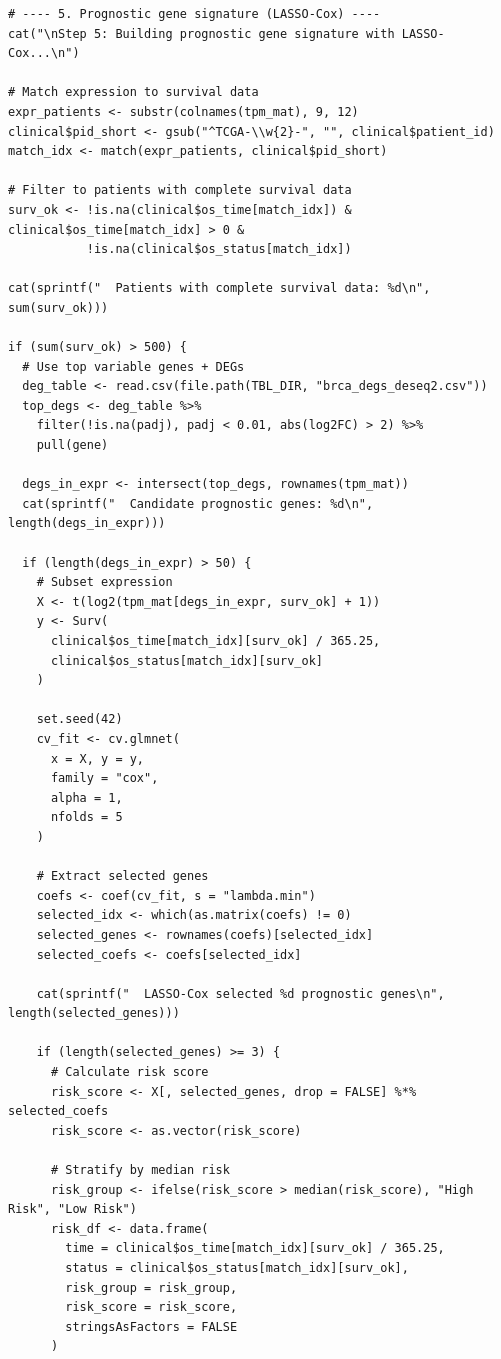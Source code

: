\documentclass[12pt,a4paper]{ctexart}
\begin{document}
\begin{lstlisting}[caption={11_survival_analysis}, basicstyle=\ttfamily\scriptsize]
# ---- 5. Prognostic gene signature (LASSO-Cox) ----
cat("\nStep 5: Building prognostic gene signature with LASSO-Cox...\n")

# Match expression to survival data
expr_patients <- substr(colnames(tpm_mat), 9, 12)
clinical$pid_short <- gsub("^TCGA-\\w{2}-", "", clinical$patient_id)
match_idx <- match(expr_patients, clinical$pid_short)

# Filter to patients with complete survival data
surv_ok <- !is.na(clinical$os_time[match_idx]) & clinical$os_time[match_idx] > 0 &
           !is.na(clinical$os_status[match_idx])

cat(sprintf("  Patients with complete survival data: %d\n", sum(surv_ok)))

if (sum(surv_ok) > 500) {
  # Use top variable genes + DEGs
  deg_table <- read.csv(file.path(TBL_DIR, "brca_degs_deseq2.csv"))
  top_degs <- deg_table %>%
    filter(!is.na(padj), padj < 0.01, abs(log2FC) > 2) %>%
    pull(gene)

  degs_in_expr <- intersect(top_degs, rownames(tpm_mat))
  cat(sprintf("  Candidate prognostic genes: %d\n", length(degs_in_expr)))

  if (length(degs_in_expr) > 50) {
    # Subset expression
    X <- t(log2(tpm_mat[degs_in_expr, surv_ok] + 1))
    y <- Surv(
      clinical$os_time[match_idx][surv_ok] / 365.25,
      clinical$os_status[match_idx][surv_ok]
    )

    set.seed(42)
    cv_fit <- cv.glmnet(
      x = X, y = y,
      family = "cox",
      alpha = 1,
      nfolds = 5
    )

    # Extract selected genes
    coefs <- coef(cv_fit, s = "lambda.min")
    selected_idx <- which(as.matrix(coefs) != 0)
    selected_genes <- rownames(coefs)[selected_idx]
    selected_coefs <- coefs[selected_idx]

    cat(sprintf("  LASSO-Cox selected %d prognostic genes\n", length(selected_genes)))

    if (length(selected_genes) >= 3) {
      # Calculate risk score
      risk_score <- X[, selected_genes, drop = FALSE] %*% selected_coefs
      risk_score <- as.vector(risk_score)

      # Stratify by median risk
      risk_group <- ifelse(risk_score > median(risk_score), "High Risk", "Low Risk")
      risk_df <- data.frame(
        time = clinical$os_time[match_idx][surv_ok] / 365.25,
        status = clinical$os_status[match_idx][surv_ok],
        risk_group = risk_group,
        risk_score = risk_score,
        stringsAsFactors = FALSE
      )


\end{lstlisting}
\end{document}
